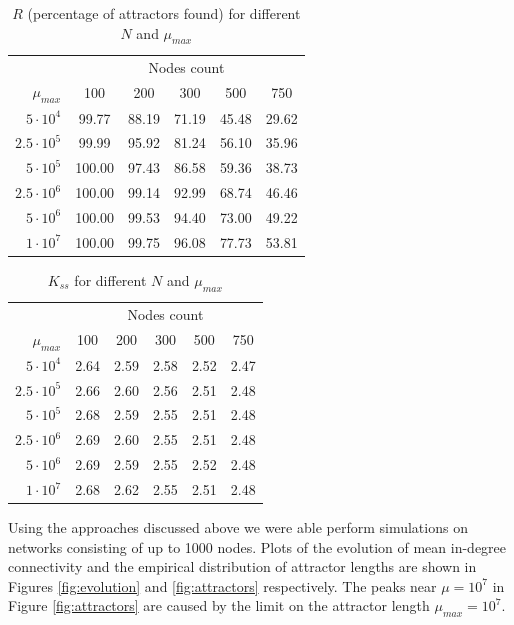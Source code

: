 \documentclass[procedia]{easychair}
\begin{document}
	\begin{table}[ht!]
		\centering
		\begin{tabular}{r | c c c c c}
			& \multicolumn{5}{c}{Nodes count} \\
			$\mu_{max}$	& 100	& 	200	&	300	&	500	&	750\\ \hline
			$5 \cdot 10^4$	&	99.77	&	88.19	&	71.19	&	45.48	&	29.62\\
			$2.5 \cdot 10^5$	&	99.99	&	95.92	&	81.24	&	56.10	&	35.96\\
			$5 \cdot 10^5$	&	100.00	&	97.43	&	86.58	&	59.36	&	38.73\\
			$2.5 \cdot 10^6$	&	100.00	&	99.14	&	92.99	&	68.74	&	46.46\\
			$5 \cdot 10^6$	&	100.00	&	99.53	&	94.40	&	73.00	&	49.22\\
			$1 \cdot 10^7$	&	100.00	&	99.75	&	96.08	&	77.73	&	53.81\\
		\end{tabular}
		\caption{$R$ (percentage of attractors found) for different $N$ and $\mu_{max}$}
		\label{table:percentage_of_attractors}
	\end{table}
	\begin{table}[ht!]
		\centering
		\begin{tabular}{r | c c c c c}
			& \multicolumn{5}{c}{Nodes count} \\
			$\mu_{max}$	& 100	& 	200	&	300	&	500	& 750\\
			\hline
			$5 \cdot 10^4$	&	2.64	&	2.59	&	2.58	&	2.52	&	2.47\\
			$2.5 \cdot 10^5$	&	2.66	&	2.60	&	2.56	&	2.51	&	2.48\\
			$5 \cdot 10^5$	&	2.68	&	2.59	&	2.55	&	2.51	&	2.48\\
			$2.5 \cdot 10^6$	&	2.69	&	2.60	&	2.55	&	2.51	&	2.48\\
			$5 \cdot 10^6$	&	2.69	&	2.59	&	2.55	&	2.52	&	2.48\\
			$1 \cdot 10^7$	&	2.68	&	2.62	&	2.55	&	2.51	&	2.48\\
		\end{tabular}
		\caption{$K_{ss}$ for different $N$ and $\mu_{max}$}
		\label{table:kss}
	\end{table}
	
	Using the approaches discussed above we were able perform simulations on networks consisting of up to 1000 nodes. Plots of the evolution of mean in-degree connectivity and the empirical distribution of attractor lengths are shown in Figures \ref{fig:evolution} and \ref{fig:attractors} respectively. The peaks near $\mu=10^7$ in Figure \ref{fig:attractors} are caused by the limit on the attractor length $\mu_{max} = 10^7$.
	
\end{document}
